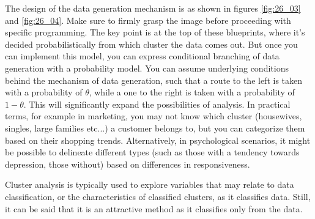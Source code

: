 \documentclass{ltjsbook}
\begin{document}

The design of the data generation mechanism is as shown in figures \ref{fig:26_03} and \ref{fig:26_04}. Make sure to firmly grasp the image before proceeding with specific programming.
The key point is at the top of these blueprints, where it's decided probabilistically from which cluster the data comes out. But once you can implement this model, you can express conditional branching of data generation with a probability model.
You can assume underlying conditions behind the mechanism of data generation, such that a route to the left is taken with a probability of $\theta$, while a one to the right is taken with a probability of $1-\theta$. This will significantly expand the possibilities of analysis.
In practical terms, for example in marketing, you may not know which cluster (housewives, singles, large families etc...) a customer belongs to, but you can categorize them based on their shopping trends. Alternatively, in psychological scenarios, it might be possible to delineate different types (such as those with a tendency towards depression, those without) based on differences in responsiveness.

Cluster analysis is typically used to explore variables that may relate to data classification, or the characteristics of classified clusters, as it classifies data. Still, it can be said that it is an attractive method as it classifies only from the data.

\end{document}

